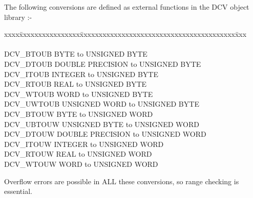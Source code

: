 The following conversions are defined as external
functions in the DCV object library :-
\begin{tabbing}
xxxx\=xxxxxxxxxxxxxxxx\=xxxxxxxxxxxxxxxxxxxxxxxxxxxxxxxxxxxxxxxxx\=xxx\kill 
{}     \\
\\
\>DCV\_BTOUB  \>BYTE to UNSIGNED BYTE \\
\>DCV\_DTOUB  \>DOUBLE PRECISION to UNSIGNED BYTE \\
\>DCV\_ITOUB  \>INTEGER to UNSIGNED BYTE \\
\>DCV\_RTOUB  \>REAL to UNSIGNED BYTE \\
\>DCV\_WTOUB  \>WORD to UNSIGNED BYTE \\
\>DCV\_UWTOUB \>UNSIGNED WORD to UNSIGNED BYTE \\
\>DCV\_BTOUW  \>BYTE to UNSIGNED WORD \\
\>DCV\_UBTOUW \>UNSIGNED BYTE to UNSIGNED WORD \\
\>DCV\_DTOUW  \>DOUBLE PRECISION to UNSIGNED WORD \\
\>DCV\_ITOUW  \>INTEGER to UNSIGNED WORD \\
\>DCV\_RTOUW  \>REAL to UNSIGNED WORD \\
\>DCV\_WTOUW  \>WORD to UNSIGNED WORD \\
\end{tabbing} 
Overflow errors are possible in ALL these conversions, so range checking is 
essential.



